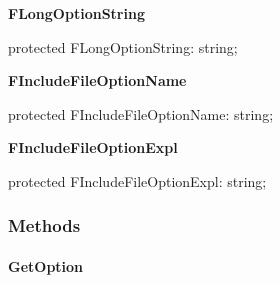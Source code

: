 \documentclass{report}
\newif\ifpdf
\begin{document}
\begin{list}{}
\begin{flushleft}
\ifpdf
\end{flushleft}
\fi


\par  \label{PasDoc_OptionParser.TOptionParser-FLongOptionString}
\item[\textbf{FLongOptionString}\hfill]
\ifpdf
\begin{flushleft}
\fi
\begin{ttfamily}
protected FLongOptionString: string;\end{ttfamily}

\ifpdf
\end{flushleft}
\fi


\par  \label{PasDoc_OptionParser.TOptionParser-FIncludeFileOptionName}
\item[\textbf{FIncludeFileOptionName}\hfill]
\ifpdf
\begin{flushleft}
\fi
\begin{ttfamily}
protected FIncludeFileOptionName: string;\end{ttfamily}

\ifpdf
\end{flushleft}
\fi


\par  \label{PasDoc_OptionParser.TOptionParser-FIncludeFileOptionExpl}
\item[\textbf{FIncludeFileOptionExpl}\hfill]
\ifpdf
\begin{flushleft}
\fi
\begin{ttfamily}
protected FIncludeFileOptionExpl: string;\end{ttfamily}

\ifpdf
\end{flushleft}
\fi


\par  \end{list}
\subsubsection*{\large{\textbf{Methods}}\normalsize\hspace{1ex}\hfill}
\paragraph*{GetOption}\hspace*{\fill}
\end{document}
